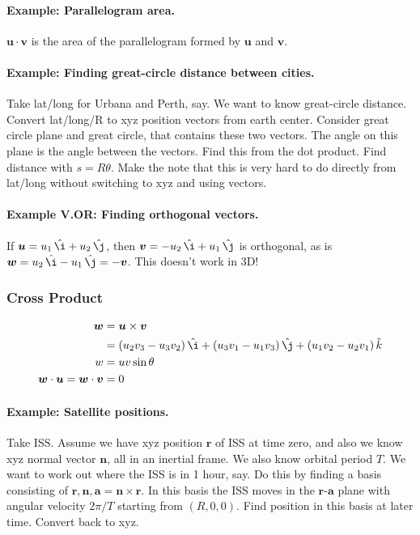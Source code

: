 \documentclass{article}
\renewcommand{\vec}[1]{\boldsymbol{#1}}
\newcommand{\unit}[1]{\,\hat{#1}}
\begin{document}
\paragraph{Example: Parallelogram area.} $\vec{u} \cdot \vec{v}$ is
the area of the parallelogram formed by $\vec{u}$ and $\vec{v}$.

\paragraph{Example: Finding great-circle distance between cities.}
Take lat/long for Urbana and Perth, say. We want to know great-circle
distance. Convert lat/long/R to xyz position vectors from earth
center. Consider great circle plane and great circle, that contains
these two vectors. The angle on this plane is the angle between the
vectors. Find this from the dot product. Find distance with $s = R
\theta$. Make the note that this is very hard to do directly from
lat/long without switching to xyz and using vectors.

\paragraph{Example V.OR: Finding orthogonal vectors.} If $\vec{u} = u_1
\unit{\i} + u_2 \unit{\j}$, then $\vec{v} = - u_2 \unit{\i} + u_1
\unit{\j}$ is orthogonal, as is $\vec{w} = u_2 \unit{\i} - u_1
\unit{\j} = -\vec{v}$. This doesn't work in 3D!

\subsubsection{Cross Product}

\begin{align}
  \vec{w} &= \vec{u} \times \vec{v} \\
  &= (u_2 v_3 - u_3 v_2) \unit{\i}
  + (u_3 v_1 - u_1 v_3) \unit{\j}
  + (u_1 v_2 - u_2 v_1) \unit{k} \\
  w &= u v \sin\theta \\
  \vec{w} \cdot \vec{u} = \vec{w} \cdot \vec{v} &= 0
\end{align}

\paragraph{Example: Satellite positions.} Take ISS. Assume we have xyz
position $\vec{r}$ of ISS at time zero, and also we know xyz normal
vector $\vec{n}$, all in an inertial frame. We also know orbital
period $T$. We want to work out where the ISS is in 1 hour, say. Do
this by finding a basis consisting of $\vec{r}, \vec{n}, \vec{a} =
\vec{n} \times \vec{r}$. In this basis the ISS moves in the
$\vec{r}$-$\vec{a}$ plane with angular velocity $2\pi / T$ starting
from $(R,0,0)$. Find position in this basis at later time. Convert
back to xyz.
\end{document}
